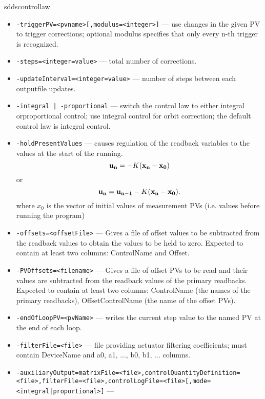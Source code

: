 \begin{sddsprog}{sddscontrollaw}
\begin{itemize}
  \item {\tt -triggerPV=<pvname>[,modulus=<integer>]} --- use changes in the given PV to trigger corrections; optional modulus specifies that only every n-th trigger is recognized.
  \item {\tt -steps=<integer=value>} ---  total number of corrections.
  \item {\tt -updateInterval=<integer=value>} --- number of steps between each outputfile updates.
  \item {\tt -integral | -proportional} ---
               switch the control law to either integral orproportional
               control;  use integral control for orbit correction;
               the default control law is integral control.
  \item {\tt -holdPresentValues} ---
               causes regulation of the readback variables to the
               values at the start of the running.
\begin{equation}
{\bf u_n} = - K ({\bf x_n} - {\bf x_0})
\end{equation}
or
\begin{equation}
{\bf u_n} = {\bf u_{n-1}} - K ({\bf x_n} - {\bf x_0}).
\end{equation}
where $x_0$ is the vector of initial values of measurement PVs (i.e. values before running the program)
  \item {\tt -offsets=<offsetFile>} --- Gives a file of offset values to be subtracted from the
               readback values to obtain the values to be held to zero.
               Expected to contain at least two columns: ControlName and Offset.
  \item {\tt -PVOffsets=<filename>} --- Gives a file of offset PVs to be read and their values are
               subtracted from the readback values of the primary readbacks.
               Expected to contain at least two columns: ControlName (the names
               of the primary readbacks), OffsetControlName (the name of
               the offset PVs).
  \item {\tt -endOfLoopPV=<pvName>} --- writes the current step value to the named PV at the end of each loop.
  \item {\tt -filterFile=<file>} --- file providing actuator filtering coefficients; must contain DeviceName and a0, a1, ..., b0, b1, ... columns.
  \item {\tt -auxiliaryOutput=matrixFile=<file>,controlQuantityDefinition=<file>,filterFile=<file>,controlLogFile=<file>[,mode=<integral|proportional>]} ---

\end{itemize}
\end{sddsprog}
